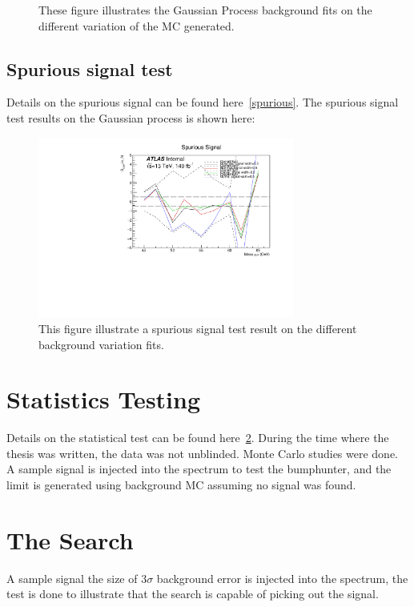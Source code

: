 \begin{figure}[!htb]
\begin{center}
        \caption{
        These figure illustrates the Gaussian Process background fits on the different variation of the MC generated. }
    \end{center}
\end{figure}



\subsection{Spurious signal test}
Details on the spurious signal can be found here~\ref{spurious}.
The spurious signal test results on the Gaussian process is shown here:

\begin{figure}[!htb]
    \begin{center}
        \includegraphics[width=0.75\textwidth]{figures/chapter_dimuon/spurious}        
        \caption{
        This figure illustrate a spurious signal test result on the different background variation fits.}
            \label{fig:dimuonstudies}
    \end{center}
\end{figure}

\section{Statistics Testing}
Details on the statistical test can be found here~\ref{}. During the time where the thesis was written, the data was not unblinded. Monte Carlo studies were done. A sample signal is injected into the spectrum to test the bumphunter, and the limit is generated using background MC assuming no signal was found.

\section{
The Search}
A sample signal the size of 3$\sigma$ background error is injected into the spectrum, the test is done to illustrate that the search is capable of picking out the signal.
    
